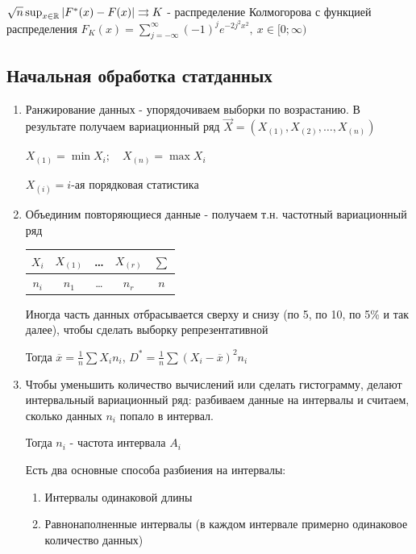 \documentclass[12pt]{article}
\begin{document}
\begin{MyTheorem}
     $\sqrt{n} \sup_{x \in \mathbb{R}} |F^*(x) - F(x)| \rightrightarrows K$ - распределение Колмогорова с 
    функцией распределения $F_K(x) = \sum_{j = -\infty}^{\infty} (-1)^j e^{-2 j^2 x^2}, \ x \in [0;\infty)$
\end{MyTheorem}

\subsection{Начальная обработка статданных}

\begin{enumerate}
    \item Ранжирование данных - упорядочиваем выборки по возрастанию. В результате получаем вариационный ряд $\vec{X} = (X_{(1)}, X_{(2)}, \dots, X_{(n)})$

    $X_{(1)} = \min X_i; \quad X_{(n)} = \max X_i$

    $X_{(i)} = i$-ая порядковая статистика

    \item Объединим повторяющиеся данные - получаем т.н. частотный вариационный ряд

    \begin{tabular}{c|c|c|c|c}
        $X_i$ & $X_{(1)}$ & \dots & $X_{(r)}$ & $\sum$ \\ 
        \hline
        $n_i$ & $n_1$ & \dots & $n_r$ & $n$ \\ 
    \end{tabular}

    Иногда часть данных отбрасывается сверху и снизу (по 5, по 10, по 5\% и так далее), чтобы сделать выборку репрезентативной

    Тогда $\overline{x} = \frac{1}{n} \sum X_i n_i$, $D^* = \frac{1}{n} \sum (X_i - \overline{x})^2 n_i$
    
    \item Чтобы уменьшить количество вычислений или сделать гистограмму, делают интервальный вариационный ряд: 
    разбиваем данные на интервалы и считаем, сколько данных $n_i$ попало в интервал. 

    Тогда $n_i$ - частота интервала $A_i$

    Есть два основные способа разбиения на интервалы: 

    \begin{enumerate}
        \item Интервалы одинаковой длины
        \item Равнонаполненные интервалы (в каждом интервале примерно одинаковое количество данных)
    \end{enumerate}


\end{enumerate}
\end{document}
